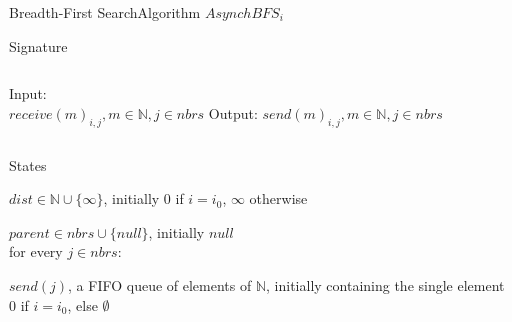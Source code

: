 \documentclass[pdf]{beamer}
\begin{document}
\begin{frame}{Breadth-First Search}{Algorithm}
	$AsynchBFS_i$
    \begin{block}{Signature}
        \begin{columns}
            Input:\\
            \hspace*{\parindent} $receive(m)_{i,j}, m \in \mathbb{N}, j \in nbrs$
            Output:
            \hspace*{\parindent} $send(m)_{i,j}, m \in \mathbb{N}, j \in nbrs$
        \end{columns}
    \end{block}
    \begin{block}{States}
        \begin{tcolorbox}[height=0.8cm,colframe=red]
        $dist \in \mathbb{N} \cup \{\infty\}$, initially $0$ if $i=i_0$, $\infty $ otherwise\\
        \end{tcolorbox}
        $parent \in nbrs \cup \{null\}$, initially $null$\\
        for every $j \in nbrs$:\\
        \hspace*{\parindent}
        \parbox{\textwidth}{$send(j)$,
        a FIFO queue of elements of $\mathbb{N}$,
        initially containing the single element $0$ if $i=i_0$, else $\emptyset$}
    \end{block}
	
\end{frame}
\end{document}
